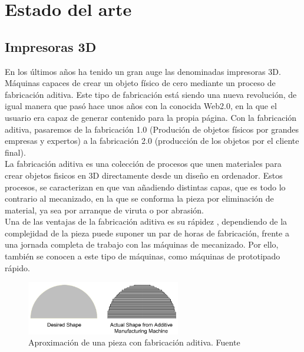 \chapter{Estado del arte}
\label{estado.arte}

\section{Impresoras 3D}
\label{arte_immpresoras}

En los últimos años ha tenido un gran auge las denominadas impresoras 3D. Máquinas capaces de crear un objeto físico de cero mediante un proceso de fabricación aditiva. Este tipo de fabricación está siendo una nueva revolución, de igual manera que pasó hace unos años con la conocida Web2.0, en la que el usuario era capaz de generar contenido para la propia página. Con la fabricación aditiva, pasaremos de la fabricación 1.0 (Produción de objetos físicos por grandes empresas y expertos) a la fabricación 2.0 (producción de los objetos por el cliente final).\cite{additive}\\

La fabricación aditiva es una colección de procesos que unen materiales para crear objetos fisicos en 3D directamente desde un diseño en ordenador. Estos procesos, se caracterizan en que van añadiendo distintas capas, que es todo lo contrario al mecanizado, en la que se conforma la pieza por eliminación de material, ya sea por arranque de viruta o por abrasión.\\

Una de las ventajas de la fabricación aditiva es su rápidez \cite{additivevssubtractive}, dependiendo de la complejidad de la pieza puede suponer un par de horas de fabricación, frente a una jornada completa de trabajo con las máquinas de mecanizado. Por ello, también se conocen a este tipo de máquinas, como máquinas de prototipado rápido.\\

    \begin{figure}[H]
            \centering
            \includegraphics[width=0.6\textwidth]{images/aproximacion_am.png}
            \caption{Aproximación de una pieza con fabricación aditiva. Fuente \cite{additive}}
            \label{fig:approach_am}
    \end{figure}

